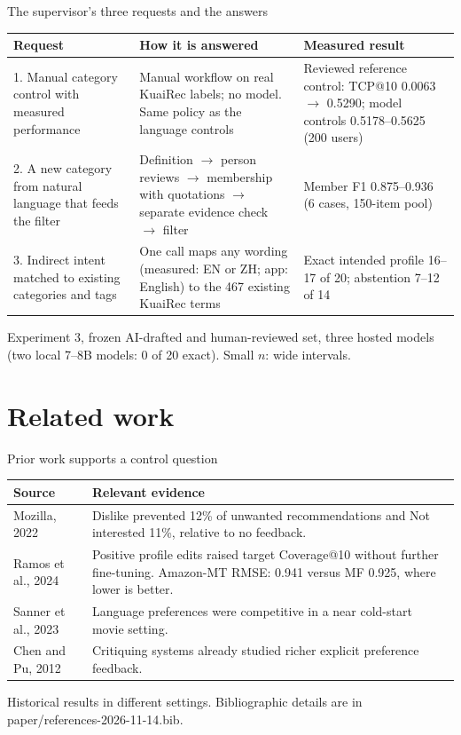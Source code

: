 \documentclass[10pt]{beamer}
\newcommand{\toprule}{\hline}
\newcommand{\midrule}{\hline}
\newcommand{\bottomrule}{\hline}
\newcommand{\src}[1]{\vfill{\tiny\color{bcitgray}#1}}
\begin{document}
\begin{frame}{The supervisor's three requests and the answers}
\footnotesize
\begin{tabular}{@{}P{3.2cm}P{4.1cm}P{2.7cm}@{}}
\toprule
Request & How it is answered & Measured result\\\midrule
1. Manual category control with measured performance & Manual workflow on real KuaiRec labels; no model. Same policy as the language controls & Reviewed reference control: TCP@10 0.0063 $\to$ 0.5290; model controls 0.5178--0.5625 (200 users)\\[0.15cm]
2. A new category from natural language that feeds the filter & Definition $\to$ person reviews $\to$ membership with quotations $\to$ separate evidence check $\to$ filter & Member F1 0.875--0.936 (6 cases, 150-item pool)\\[0.15cm]
3. Indirect intent matched to existing categories and tags & One call maps any wording (measured: EN or ZH; app: English) to the 467 existing KuaiRec terms & Exact intended profile 16--17 of 20; abstention 7--12 of 14\\\bottomrule
\end{tabular}\par
\src{Experiment 3, frozen AI-drafted and human-reviewed set, three hosted models (two local 7--8B models: 0 of 20 exact). Small $n$: wide intervals.}
\end{frame}

\section{Related work}
\begin{frame}{Prior work supports a control question}
\small
\begin{tabular}{@{}P{2.1cm}P{8.0cm}@{}}
\toprule
Source & Relevant evidence\\\midrule
Mozilla, 2022 & Dislike prevented 12\% of unwanted recommendations and Not interested 11\%, relative to no feedback.\\[0.15cm]
Ramos et al., 2024 & Positive profile edits raised target Coverage@10 without further fine-tuning. Amazon-MT RMSE: 0.941 versus MF 0.925, where lower is better.\\[0.15cm]
Sanner et al., 2023 & Language preferences were competitive in a near cold-start movie setting.\\[0.15cm]
Chen and Pu, 2012 & Critiquing systems already studied richer explicit preference feedback.\\\bottomrule
\end{tabular}\par
\src{Historical results in different settings. Bibliographic details are in paper/references-2026-11-14.bib.}
\end{frame}
\end{document}
